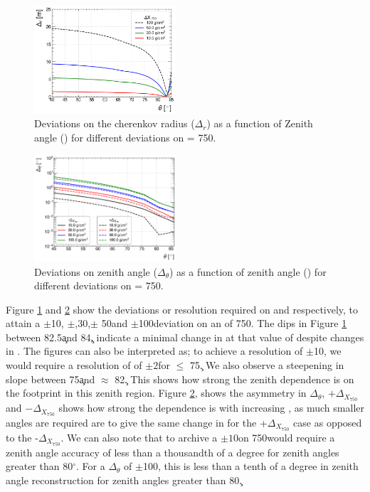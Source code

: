\begin{figure}[ht!]
    \includegraphics[width=0.47\textwidth]{gramm5}
    \caption{Deviations on  the cherenkov radius ($\Delta_r$) as a function of Zenith angle (\thet) for different deviations on \x = 750\gr.}
    \label{fig:gramm5}
\end{figure}
\begin{figure}[ht!]
    \includegraphics[width=0.47\textwidth]{gramm6}
    \caption{Deviations on zenith angle ($\Delta_\theta$) as a function of zenith angle (\thet) for different deviations on \x = 750\gr.}
    \label{fig:gramm6}
\end{figure}
Figure \ref{fig:gramm5} and \ref{fig:gramm6} show the deviations or resolution required on \rc and \thet respectively, to attain a $\pm$10\gr, $\pm$,30\gr,$\pm$ 50\gr and $\pm$100\gr deviation on an \x of 750\gr. The dips in Figure \ref{fig:gramm5} between 82.5\c and 84\c, indicate a minimal change in \rc at that value of \thet despite changes in \x. The figures can also be interpreted as; to achieve a resolution of $\pm$10\gr, we would require a resolution of \rc of $\pm2$\m for \thet $\leq$  75\c. We also observe a steepening in slope between 75\c and $\approx$ 82\c. This shows how strong the zenith dependence is on the footprint in this zenith region. Figure \ref{fig:gramm6}, shows the asymmetry in $\Delta_\theta$, $+\Delta_{X_{750}}$ and $-\Delta_{X_{750}}$ shows how strong the \rc dependence is with increasing \thet, as much smaller angles are required are to give the same change in \rc for the +$\Delta_{X_{750}}$ case as opposed to the -$\Delta_{X_{750}}$. We can also note that to archive a $\pm10$\gr on 750\gr would require a zenith angle accuracy of less than a thousandth of a degree for zenith angles greater than 80$^{\circ}$. For a $\Delta_\theta$ of $\pm$100\gr, this is less than a tenth of a degree in zenith angle reconstruction for zenith angles greater than 80\c.  

